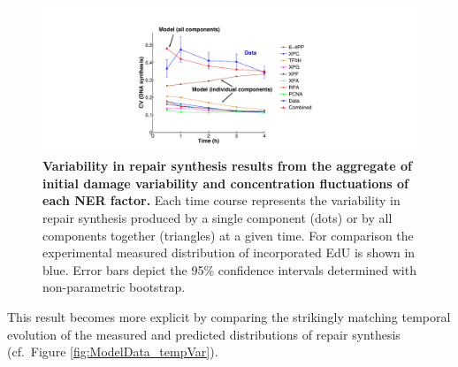 \begin{figure}[htbp]
	\begin{center}
		\includegraphics[width=1\textwidth]{Abbildungen/figure3_8.pdf}
		\caption{\textbf{Variability in repair synthesis results from the aggregate of initial damage variability and concentration fluctuations of each NER factor.} Each time course represents the variability in repair synthesis produced by a single component (dots) or by all components together (triangles) at a given time. For comparison the experimental measured distribution of incorporated EdU is shown in blue. Error bars depict the 95\% confidence intervals determined with non-parametric bootstrap.}
		\label{fig:CV_Var_comp}
	\end{center}
\end{figure}
This result becomes more explicit by comparing the strikingly matching temporal evolution of the measured and predicted distributions of repair synthesis (cf.\ Figure \ref{fig:ModelData_tempVar}).



